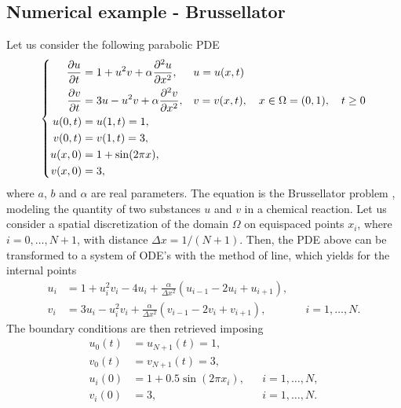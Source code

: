 \subsection{Numerical example - Brussellator}

Let us consider the following parabolic PDE
\begin{equation}
\left \{
\begin{aligned}
	\pdv{u}{t} &= 1 + u^2v + \alpha \pdv[2]{u}{x}, && u = u(x, t)\\
	\pdv{v}{t} &= 3u - u^2v + \alpha \pdv[2]{v}{x}, && v = v(x, t), \quad x \in \Omega = (0, 1), \quad t \geq 0 \\
	u(0, t) &= u(1, t) = 1, \\
	v(0, t) &= v(1, t) = 3, \\
	u(x, 0) &= 1 + \sin(2\pi x), \\
	v(x, 0) &= 3,
\end{aligned}\right.
\end{equation}
where $a$, $b$ and $\alpha$ are real parameters. The equation is the Brussellator problem \cite{HaW96}, modeling the quantity of two substances $u$ and $v$ in a chemical reaction. Let us consider a spatial discretization of the domain $\Omega$ on equispaced points $x_i$, where $i = 0, \ldots, N + 1$, with distance $\Delta x = 1 / (N + 1)$. Then, the PDE above can be transformed to a system of ODE's with the method of line, which yields for the internal points
\begin{equation}\label{eq:BRUSS}
\begin{aligned}
u_i &= 1 + u_i^2v_i - 4u_i + \frac{\alpha}{\Delta x^2}(u_{i-1} - 2u_{i} + u_{i+1}), \\
v_i &= 3u_i - u_i^2v_i + \frac{\alpha}{\Delta x^2}(v_{i-1}-2v_i + v_{i+1}), && i = 1, \ldots, N.
\end{aligned}
\end{equation}
The boundary conditions are then retrieved imposing
\begin{equation}
\begin{aligned}
	u_0(t) &= u_{N+1}(t) = 1,  \\
	v_0(t) &= v_{N+1}(t) = 3, \\
	u_i(0) &= 1 + 0.5\sin(2\pi x_i), && i = 1, \ldots, N, \\
	v_i(0) &= 3, && i = 1, \ldots, N.
\end{aligned}
\end{equation}

